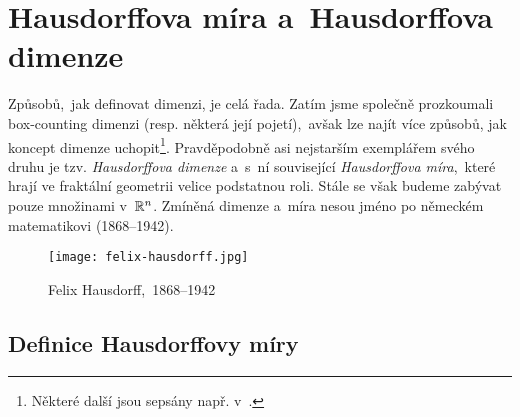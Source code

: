\section{Hausdorffova míra a~Hausdorffova dimenze}\label{sec:hausdorffova-mira-dimenze}

Způsobů,~jak definovat dimenzi, je celá řada. Zatím jsme společně prozkoumali box-counting dimenzi (resp. některá její pojetí),~avšak lze najít více způsobů, jak koncept dimenze uchopit\footnote{Některé další jsou sepsány např. v~\citep[str. 40]{Falconer2014}.}. Pravděpodobně asi nejstarším exemplářem svého druhu je tzv. \emph{Hausdorffova dimenze} a~s~ní související \emph{Hausdorffova míra},~které hrají ve fraktální geometrii velice podstatnou roli. Stále se však budeme zabývat pouze množinami v~$\mathbb{R}^n$. Zmíněná dimenze a~míra nesou jméno po německém matematikovi  (1868--1942).
\begin{figure}[h]
    \centering
    \texttt{[image: felix-hausdorff.jpg]}
    \caption[Felix Hausdorff,~1868--1942]{Felix Hausdorff\footnotemark,~1868--1942}
    \label{fig:felix-hausdorff}
\end{figure}

\subsection{Definice Hausdorffovy míry}\label{subsec:hd-mira-definice}

